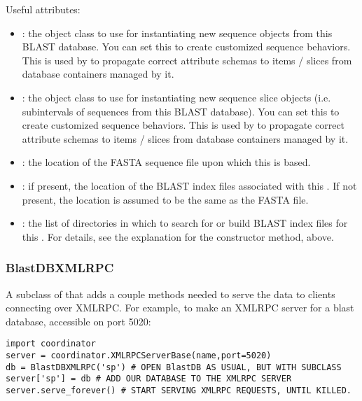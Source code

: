 \documentclass{howto}
\begin{document}
Useful attributes:
\begin{itemize}

\item
{}: the object class to use for instantiating new sequence objects from this BLAST database.  You can set this to create customized sequence behaviors.  
This is used by  to propagate correct attribute schemas to
items / slices from database containers managed by it.

\item
{}: the object class to use for instantiating new sequence slice objects (i.e. subintervals of sequences from this BLAST database).  You can set this to create customized sequence behaviors.
This is used by  to propagate correct attribute schemas to
items / slices from database containers managed by it.

\item
{}: the location of the FASTA sequence file upon which
this  is based.

\item
{}: if present, the location of the BLAST index files
associated with this .  If not present, the location is assumed
to be the same as the FASTA file.

\item
{}: the list of directories in which to search for
or build BLAST index files for this .  For details, see
the explanation for the constructor method, above.

\end{itemize}

\subsubsection{BlastDBXMLRPC}
A subclass of  that adds a couple methods needed to serve
the data to clients connecting over XMLRPC.  For example, to make an XMLRPC
server for a blast database, accessible on port 5020:
\begin{verbatim}
import coordinator
server = coordinator.XMLRPCServerBase(name,port=5020)
db = BlastDBXMLRPC('sp') # OPEN BlastDB AS USUAL, BUT WITH SUBCLASS
server['sp'] = db # ADD OUR DATABASE TO THE XMLRPC SERVER
server.serve_forever() # START SERVING XMLRPC REQUESTS, UNTIL KILLED.
\end{verbatim}
\end{document}
